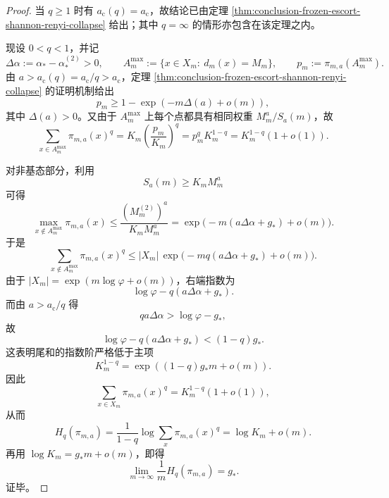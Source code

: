\begin{proof}
当 \(q\ge 1\) 时有 \(a_{\mathrm c}(q)=a_{\mathrm c}\)，故结论已由定理 \ref{thm:conclusion-frozen-escort-shannon-renyi-collapse} 给出；其中 \(q=\infty\) 的情形亦包含在该定理之内。

现设 \(0<q<1\)，并记
\[
\Delta\alpha:=\alpha_\ast-\alpha_\ast^{(2)}>0,
\qquad
A_m^{\max}:=\{x\in X_m:\ d_m(x)=M_m\},
\qquad
p_m:=\pi_{m,a}(A_m^{\max}).
\]
由 \(a>a_{\mathrm c}(q)=a_{\mathrm c}/q>a_{\mathrm c}\)，定理 \ref{thm:conclusion-frozen-escort-shannon-renyi-collapse} 的证明机制给出
\[
p_m\ge 1-\exp(-m\Delta(a)+o(m)),
\]
其中 \(\Delta(a)>0\)。又由于 \(A_m^{\max}\) 上每个点都具有相同权重 \(M_m^a/S_a(m)\)，故
\[
\sum_{x\in A_m^{\max}}\pi_{m,a}(x)^q
=
K_m\left(\frac{p_m}{K_m}\right)^q
=
p_m^q K_m^{1-q}
=
K_m^{1-q}(1+o(1)).
\]

对非基态部分，利用
\[
S_a(m)\ge K_mM_m^a
\]
可得
\[
\max_{x\notin A_m^{\max}}\pi_{m,a}(x)
\le
\frac{(M_m^{(2)})^a}{K_mM_m^a}
=
\exp\!\bigl(-m(a\Delta\alpha+g_\ast)+o(m)\bigr).
\]
于是
\[
\sum_{x\notin A_m^{\max}}\pi_{m,a}(x)^q
\le
|X_m|\,
\exp\!\bigl(-mq(a\Delta\alpha+g_\ast)+o(m)\bigr).
\]
由于 \(|X_m|=\exp(m\log\varphi+o(m))\)，右端指数为
\[
\log\varphi-q(a\Delta\alpha+g_\ast).
\]
而由 \(a>a_{\mathrm c}/q\) 得
\[
qa\Delta\alpha>\log\varphi-g_\ast,
\]
故
\[
\log\varphi-q(a\Delta\alpha+g_\ast)<(1-q)g_\ast.
\]
这表明尾和的指数阶严格低于主项
\[
K_m^{1-q}=\exp((1-q)g_\ast m+o(m)).
\]
因此
\[
\sum_{x\in X_m}\pi_{m,a}(x)^q
=
K_m^{1-q}(1+o(1)),
\]
从而
\[
H_q(\pi_{m,a})
=
\frac{1}{1-q}\log\sum_x \pi_{m,a}(x)^q
=
\log K_m+o(m).
\]
再用 \(\log K_m=g_\ast m+o(m)\)，即得
\[
\lim_{m\to\infty}\frac1m H_q(\pi_{m,a})=g_\ast.
\]
证毕。
\end{proof}


